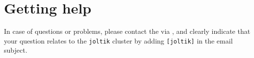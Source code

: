 





\section{Getting help}
\label{sec:gpu_ugent_help}

In case of questions or problems, please contact the \hpcTeam via \hpcinfo, and clearly indicate that your question
relates to the \lstinline|joltik| cluster by adding \lstinline|[joltik]| in the email subject.


